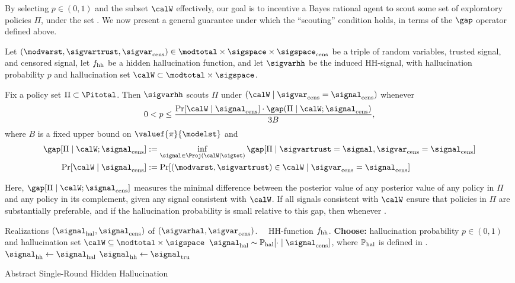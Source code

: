 By selecting $p \in (0,1)$ and the subset $\calW$ effectively, our goal is to incentive a Bayes rational agent to scout some set of exploratory policies $\Pi$, under the set . We now present a general guarantee under which the ``scouting'' condition holds, in terms of the $\gap$ operator defined above. 

\newcommand{\boldp}{\mathbf{p}}
\begin{theorem} 
Let $(\modvarst,\sigvartrust,\sigvarcens)\in \modtotal \times \sigspace \times \sigspacecens$ be a triple of random variables, trusted signal, and censored signal,  let  $f_{\mathrm{hh}}$ be a hidden hallucination function, and let $\sigvarhh$ be the induced HH-signal, with hallucination probability $p$ and hallucination set $\calW \subset \modtotal \times \sigspace$.

Fix a policy set $\Pi\subset \Pitotal$. Then $\sigvarhh$ scouts $\Pi$ under $(\calW \mid \sigvarcens = \sigcens)$
whenever
\begin{align}
 0 < p \le \frac{\Pr[ \calW \mid  \sigcens]\cdot \gap(\Pi \mid \calW;\sigcens)}{3B},
 \end{align} 
where $B$ is a fixed upper bound on  $\valuef{\pi}{\modelst}$ and 
\begin{align}
\gap[\Pi \mid \calW;\sigcens] &:= \inf_{\signal \in \Proj(\calW \mid \sigtot) } \gap[\Pi \mid \sigvartrust = \signal,\sigvarcens = \sigcens ]\\
\Pr[ \calW \mid  \sigcens] &:= \Pr[(\modvarst,\sigvartrust) \in \calW \mid \sigvarcens = \sigcens]
\end{align}  
\end{theorem}
Here, $\gap[\Pi \mid \calW;\sigcens] $ measures the minimal difference between the posterior value of any posterior value of any policy in $\Pi$ and any policy in its complement, given any signal consistent with $\calW$. If all signals consistent with $\calW$ ensure that policies in $\Pi$ are substantially preferable, and if the hallucination probability is small relative to this gap, then whenever \mscomment{\dots}.



\begin{algorithm}[h]
  	\begin{algorithmic}[1]
  	 Realizations
  	$(\sighal,\sigcens)$ of $(\sigvarhal,\sigvarcens)$.
  	\Statex{}~~\quad\qquad HH-function $f_{\mathrm{hh}}$.
  	\State{}\textbf{Choose:} hallucination probability $p \in (0,1)$ and hallucination set  $\calW \subseteq  \modtotal \times \sigspace$ 
  	\Statex{}
  	 $\sighal \sim \Prhal[\cdot \mid \sigcens]$, where $\mathbb{P}_{\mathrm{hal}}$ is defined in .
   	\State{} $\sighh \gets \sighal$
   	 $\sighh\gets \sigtrust$
  \end{algorithmic}
  \caption{Abstract Single-Round Hidden Hallucination }
  \label{alg:abstract_HH}
	\end{algorithm}


